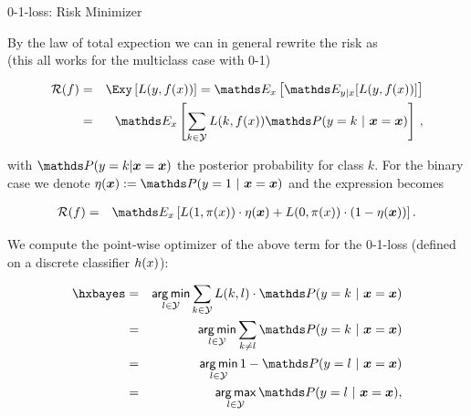 \begin{vbframe}{0-1-loss: Risk Minimizer}

By the law of total expection we can in general rewrite the risk as\\
(this all works for the multiclass case with 0-1)

\vspace*{-0.5cm}

\begin{eqnarray*}
  \riskf  & = & \Exy\left[\Lxy\right] = \E_x \left[ \E_{y|x} [ L(y, \fx) ] \right] \\
          & = & \E_x \left[\sum_{k \in \Yspace} L(k, \fx) \P(y = k~|~ \xv = \xv)\right]\,, 
\end{eqnarray*}

with $\P(y = k| \xv = \xv)$ the posterior probability for class $k$. For the binary case we denote $\eta(\xv) := \P(y = 1 ~|~ \xv = \xv)$ and the expression becomes 

\vspace*{-0.3cm}


\begin{eqnarray*}
  \riskf &=& \E_x \left[L(1, \pix) \cdot \eta(\xv) + L(0, \pix) \cdot (1 - \eta(\xv)) \right]. 
\end{eqnarray*}







\framebreak 

We compute the point-wise optimizer of the above term for the 0-1-loss (defined on a discrete classifier $h(x)$): 

  \begin{eqnarray*}  
  \hxbayes &=& \argmin_{l \in \Yspace} \sum_{k \in \Yspace} L(k, l) \cdot \P(y = k~|~\xv = \xv) \\
  &=& \argmin_{l \in \Yspace} \sum_{k \ne l} \P(y = k~|~\xv = \xv) \\ 
  &=& \argmin_{l \in \Yspace} 1 - \P(y = l~|~\xv = \xv) \\
  &=& \argmax_{l \in \Yspace} \P(y = l~|~ \xv = \xv),
  \end{eqnarray*}


\end{vbframe}
